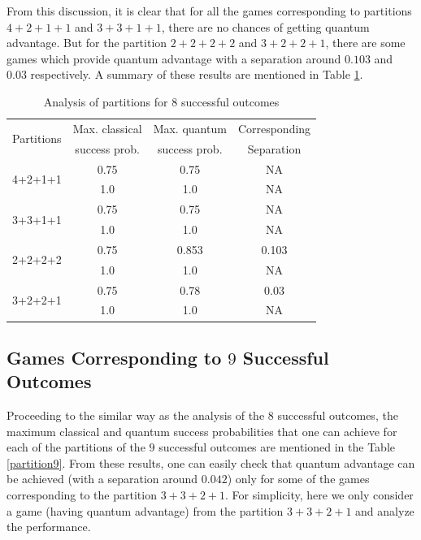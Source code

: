 \documentclass[]{svjour3}
\begin{document}
From this discussion, it is clear that for all the games corresponding to partitions $4+2+1+1$ and $3+3+1+1$, there are no chances of getting quantum advantage. But for the partition $2+2+2+2$ and $3+2+2+1$, there are some games which provide quantum advantage with a separation around $0.103$ and $0.03$ respectively. A summary of these results are mentioned in Table \ref{partition8}. 


\begin{table}[htb]
	\begin{center} 
			\begin{tabular}{ |c|c|c|c| } 
				\hline
				\multirow{2}{*}{Partitions} & Max. classical & Max. quantum & Corresponding\\
				~ & success prob. & success prob. & Separation\\
				\hline
				\hline
				\multirow{2}{*}{4+2+1+1} & 0.75 & 0.75 & NA\\
				~ & 1.0 & 1.0 & NA \\
				\hline
				\multirow{2}{*}{3+3+1+1} & 0.75 & 0.75 & NA\\
				~ & 1.0 & 1.0 & NA \\
				\hline
				\multirow{2}{*}{2+2+2+2} & 0.75 & 0.853 & 0.103\\
				~ & 1.0 & 1.0 & NA \\
				\hline 
				\multirow{2}{*}{3+2+2+1} & 0.75 & 0.78 & 0.03\\
				~ & 1.0 & 1.0 & NA \\
				\hline
			\end{tabular}
	\end{center}
	\caption{Analysis of partitions for $8$ successful outcomes}
	\label{partition8}
\end{table}

\subsection{Games Corresponding to $9$ Successful Outcomes}
Proceeding to the similar way as the analysis of the $8$ successful outcomes, the maximum classical and quantum success probabilities that one can achieve for each of the partitions of the $9$ successful outcomes are mentioned in the Table \ref{partition9}. From these results, one can easily check that quantum advantage can be achieved (with a separation around $0.042$) only for some of the games corresponding to the partition $3+3+2+1$. For simplicity, here we only consider a game (having quantum advantage) from the partition $3+3+2+1$ and analyze the performance.
\end{document}
